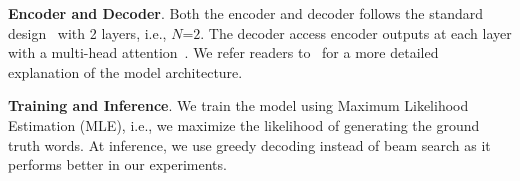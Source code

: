 \documentclass[runningheads]{llncs}
\begin{document}
\kern2mm
\noindent\textbf{Encoder and Decoder}. Both the encoder and decoder follows the standard design~\cite{vaswani2017attention} with 2 layers, i.e., $N \mbox{=} 2$. 
The decoder access encoder outputs at each layer with a multi-head attention~\cite{vaswani2017attention}.  
We refer readers to~\cite{vaswani2017attention} for a more detailed explanation of the model architecture.

\kern2mm
\noindent\textbf{Training and Inference}. 
We train the model using Maximum Likelihood Estimation (MLE), i.e., we maximize the likelihood of generating the ground truth words.
At inference, we use greedy decoding instead of beam search as it performs better in our experiments.



\begin{table}[!t]
\setlength{\tabcolsep}{0.3em}
\small
\centering
\small
\caption{Model comparison on TVC \textit{test-public} set, with different input context}
\label{tab:tvc_res}
\end{table}

\begin{table}[!t]
\setlength{\tabcolsep}{0.3em}
\centering
\small
\caption{Feature ablation on TVC \textit{val} set. All the models use both videos and subtitles}
\label{tab:tvc_feature_ablation}
\end{table}
\end{document}
